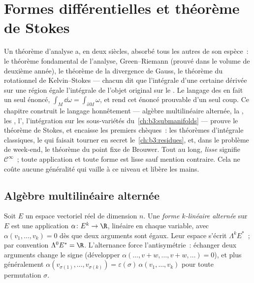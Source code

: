 \chapter{Formes différentielles et théorème de Stokes}\label{ch:b3:forms}

Un théorème d'analyse a, en deux siècles, absorbé tous
les autres de son espèce~: le théorème fondamental de l'analyse,
Green--Riemann (prouvé dans le volume de deuxième année), le théorème
de la divergence de Gauss, le théorème du rotationnel de
Kelvin--Stokes --- chacun dit que l'intégrale d'une certaine
dérivée sur une région égale l'intégrale de l'objet original
sur le . Le langage des \emph{}
en fait un seul énoncé, $\int_M\dd\omega = \int_{\partial
M}\omega$, et rend cet énoncé prouvable d'un seul coup. Ce
chapitre construit le langage honnêtement --- algèbre
multilinéaire alternée, la , les , l', l'intégration sur les sous-variétés
du~\cref{ch:b3:submanifolds} --- prouve le théorème de Stokes,
et encaisse les premiers chèques~: les théorèmes d'intégrale
classiques, le \emph{} qui faisait tourner
en secret le~\cref{ch:b3:residues}, et, dans le problème de
week-end, le théorème du point fixe de Brouwer. Tout au long,
\emph{lisse} signifie $\mathcal C^\infty$~; toute application
et toute forme est lisse sauf mention contraire. Cela ne coûte
aucune généralité qui vaille à ce niveau et libère les mains.

\section{Algèbre multilinéaire alternée}

\begin{definition}\label{def:b3:forms:alternating}
Soit $E$ un espace vectoriel réel de dimension $n$. Une
\emph{forme $k$-linéaire alternée} sur
$E$ est une application $\alpha\colon E^k \to \R$, linéaire
en chaque variable, avec $\alpha(v_1, \dots, v_k) = 0$ dès
que deux arguments sont égaux. Leur espace s'écrit $\Lambda^k
E^*$~; par convention $\Lambda^0E^* = \R$. L'alternance force
l'antisymétrie~: échanger deux arguments change le signe
(développer $\alpha(\dots, v + w, \dots, v + w, \dots) =
0$), et plus généralement $\alpha(v_{\sigma(1)}, \dots,
v_{\sigma(k)}) = \varepsilon(\sigma)\,\alpha(v_1, \dots,
v_k)$ pour toute permutation $\sigma$.
\end{definition}

